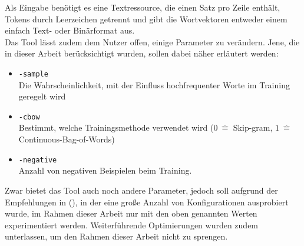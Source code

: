   Als Eingabe benötigt es eine Textressource, die einen Satz pro Zeile enthält, Tokens durch Leerzeichen getrennt und gibt die Wortvektoren
  entweder einem einfach Text- oder Binärformat aus.\\
  Das Tool lässt zudem dem Nutzer offen, einige Parameter zu verändern. Jene, die in dieser Arbeit berücksichtigt wurden, sollen
  dabei näher erläutert werden:
  \begin{itemize}
    \item \verb|-sample|\\Die Wahrscheinlichkeit, mit der Einfluss hochfrequenter Worte im Training geregelt wird
    \item \verb|-cbow|\\Bestimmt, welche Trainingsmethode verwendet wird ($0\ \hat{=}$ Skip-gram, $1\ \hat{=}$ Continuous-Bag-of-Words)
    \item \verb|-negative|\\Anzahl von negativen Beispielen beim Training.
  \end{itemize}

  Zwar bietet das Tool auch noch andere Parameter, jedoch soll aufgrund der Empfehlungen in (\citeauthor{levy2015improving}), in
  der eine große Anzahl von Konfigurationen ausprobiert wurde, im Rahmen dieser Arbeit nur mit den oben genannten Werten experimentiert werden.
  Weiterführende Optimierungen wurden zudem unterlassen, um den Rahmen dieser Arbeit nicht zu sprengen.
